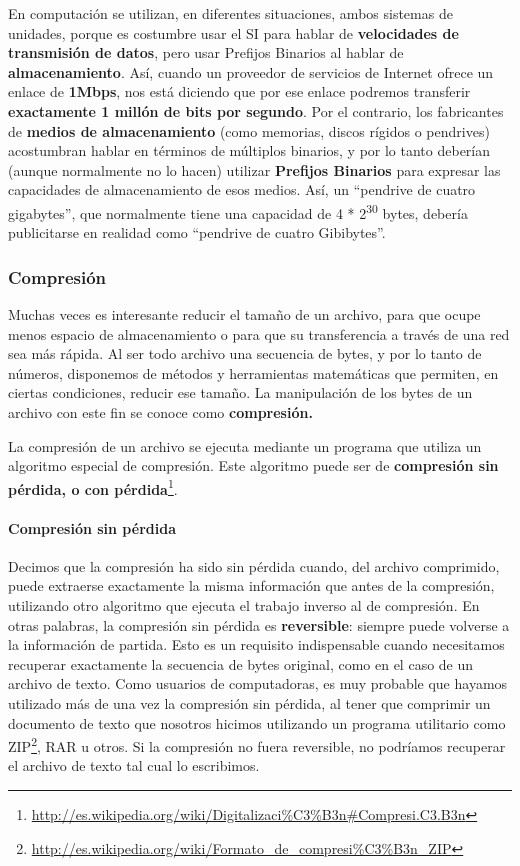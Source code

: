 \documentclass[a4paper]{article}
\begin{document}
En computaci\'on se utilizan, en diferentes situaciones, ambos sistemas
de unidades, porque es costumbre usar el SI para hablar de
\textbf{velocidades de transmisi\'on de datos}, pero usar Prefijos
Binarios al hablar de \textbf{almacenamiento}. As\'i, cuando un
proveedor de servicios de Internet ofrece un enlace de \textbf{1Mbps},
nos est\'a diciendo que por ese enlace podremos transferir
\textbf{exactamente 1 mill\'on de bits por segundo}. Por el contrario,
los fabricantes de \textbf{medios de almacenamiento} (como memorias,
discos r\'igidos o pendrives) acostumbran hablar en t\'erminos de
m\'ultiplos binarios, y por lo tanto deber\'ian (aunque normalmente no
lo hacen) utilizar \textbf{Prefijos Binarios} para expresar las
capacidades de almacenamiento de esos medios. As\'i, un
{\textquotedblleft}pendrive de cuatro gigabytes{\textquotedblright},
que normalmente tiene una capacidad de 4 * 2\textsuperscript{30} bytes,
deber\'ia publicitarse en realidad como {\textquotedblleft}pendrive de
cuatro Gibibytes{\textquotedblright}. 

\subsubsection{Compresi\'on}
Muchas veces es interesante reducir el tama\~no de un archivo, para que
ocupe menos espacio de almacenamiento o para que su transferencia a
trav\'es de una red sea m\'as r\'apida. Al ser todo archivo una
secuencia de bytes, y por lo tanto de n\'umeros, disponemos de
m\'etodos y herramientas matem\'aticas que permiten, en ciertas
condiciones, reducir ese tama\~no. La manipulaci\'on de los bytes de un
archivo con este fin se conoce como \textbf{compresi\'on.}

La compresi\'on de un archivo se ejecuta mediante un programa que
utiliza un algoritmo especial de compresi\'on. Este algoritmo puede ser
de \textbf{compresi\'on sin p\'erdida, o con
p\'erdida}\footnote{\href{http://es.wikipedia.org/wiki/Digitalizaci?n\#Compresi.C3.B3n}{http://es.wikipedia.org/wiki/Digitalizaci\%C3\%B3n\#Compresi.C3.B3n}}.

\paragraph{Compresi\'on sin p\'erdida}
Decimos que la compresi\'on ha sido sin p\'erdida cuando, del archivo
comprimido, puede extraerse exactamente la misma informaci\'on que
antes de la compresi\'on, utilizando otro algoritmo que ejecuta el
trabajo inverso al de compresi\'on. En otras palabras, la compresi\'on
sin p\'erdida es \textbf{reversible}: siempre puede volverse a la
informaci\'on de partida. Esto es un requisito indispensable cuando
necesitamos recuperar exactamente la secuencia de bytes original, como
en el caso de un archivo de texto. Como usuarios de computadoras, es
muy probable que hayamos utilizado m\'as de una vez la compresi\'on sin
p\'erdida, al tener que comprimir un documento de texto que nosotros
hicimos utilizando un programa utilitario como
ZIP\footnote{\href{http://es.wikipedia.org/wiki/Formato_de_compresi?n_ZIP}{http://es.wikipedia.org/wiki/Formato\_de\_compresi\%C3\%B3n\_ZIP}},
RAR u otros. Si la compresi\'on no fuera reversible, no podr\'iamos
recuperar el archivo de texto tal cual lo escribimos.
\end{document}
